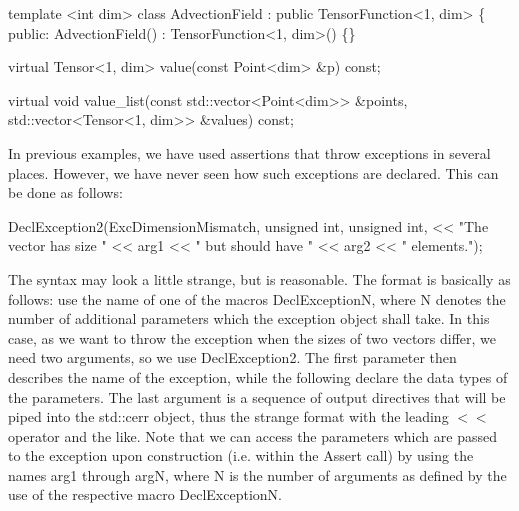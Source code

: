 \begin{DoxyCode}
\textcolor{keyword}{template} <\textcolor{keywordtype}{int} dim>
\textcolor{keyword}{class }AdvectionField : \textcolor{keyword}{public} TensorFunction<1, dim> \{
\textcolor{keyword}{public}:
    AdvectionField() : TensorFunction<1, dim>() \{\}

    \textcolor{keyword}{virtual} Tensor<1, dim> value(\textcolor{keyword}{const} Point<dim> &p) \textcolor{keyword}{const};

    \textcolor{keyword}{virtual} \textcolor{keywordtype}{void} value\_list(\textcolor{keyword}{const} std::vector<Point<dim>> &points,
                            std::vector<Tensor<1, dim>> &values) \textcolor{keyword}{const};
\end{DoxyCode}


In previous examples, we have used assertions that throw exceptions in several places. However, we have never seen how such exceptions are declared. This can be done as follows\+:


\begin{DoxyCode}
DeclException2(ExcDimensionMismatch, \textcolor{keywordtype}{unsigned} \textcolor{keywordtype}{int}, \textcolor{keywordtype}{unsigned} \textcolor{keywordtype}{int},
               << \textcolor{stringliteral}{"The vector has size "} << arg1 << \textcolor{stringliteral}{" but should have "}
               << arg2 << \textcolor{stringliteral}{" elements."});
\end{DoxyCode}


The syntax may look a little strange, but is reasonable. The format is basically as follows\+: use the name of one of the macros {\ttfamily Decl\+ExceptionN}, where {\ttfamily N} denotes the number of additional parameters which the exception object shall take. In this case, as we want to throw the exception when the sizes of two vectors differ, we need two arguments, so we use {\ttfamily Decl\+Exception2}. The first parameter then describes the name of the exception, while the following declare the data types of the parameters. The last argument is a sequence of output directives that will be piped into the {\ttfamily std\+::cerr} object, thus the strange format with the leading {\ttfamily $<$$<$} operator and the like. Note that we can access the parameters which are passed to the exception upon construction (i.\+e. within the {\ttfamily Assert} call) by using the names {\ttfamily arg1} through {\ttfamily argN}, where {\ttfamily N} is the number of arguments as defined by the use of the respective macro {\ttfamily Decl\+ExceptionN}.

